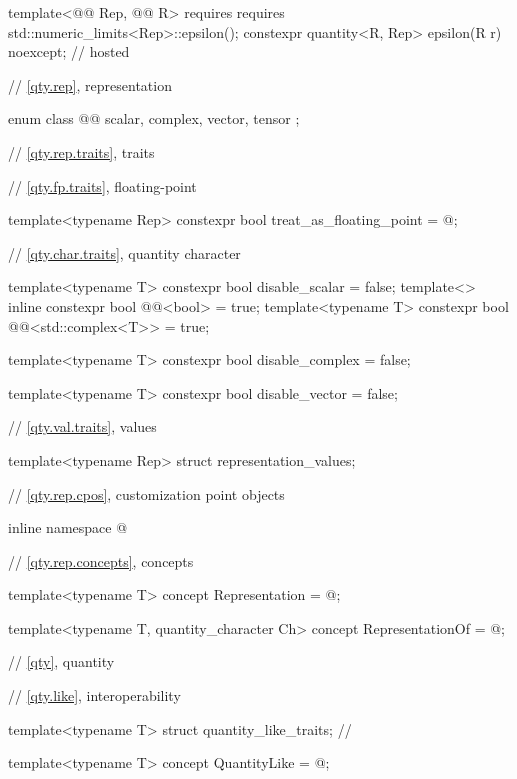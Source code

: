 \begin{codeblock}
{template<@@ Rep, @@ R>
  requires requires { std::numeric_limits<Rep>::epsilon(); }
constexpr quantity<R{}, Rep> epsilon(R r) noexcept;                                     // hosted

// \ref{qty.rep}, representation

enum class @@ { scalar, complex, vector, tensor };

// \ref{qty.rep.traits}, traits

// \ref{qty.fp.traits}, floating-point

template<typename Rep>
constexpr bool treat_as_floating_point = @\seebelownc@;

// \ref{qty.char.traits}, quantity character

template<typename T>
constexpr bool disable_scalar = false;
template<>
inline constexpr bool @@<bool> = true;
template<typename T>
constexpr bool @@<std::complex<T>> = true;

template<typename T>
constexpr bool disable_complex = false;

template<typename T>
constexpr bool disable_vector = false;

// \ref{qty.val.traits}, values

template<typename Rep>
struct representation_values;

// \ref{qty.rep.cpos}, customization point objects

inline namespace @

// \ref{qty.rep.concepts}, concepts

template<typename T>
concept Representation = @\seebelownc@;

template<typename T, quantity_character Ch>
concept RepresentationOf = @\seebelownc@;

// \ref{qty}, quantity

// \ref{qty.like}, interoperability

template<typename T>
struct quantity_like_traits;  // \notdef

template<typename T>
concept QuantityLike = @\seebelownc@;

}
\end{codeblock}
